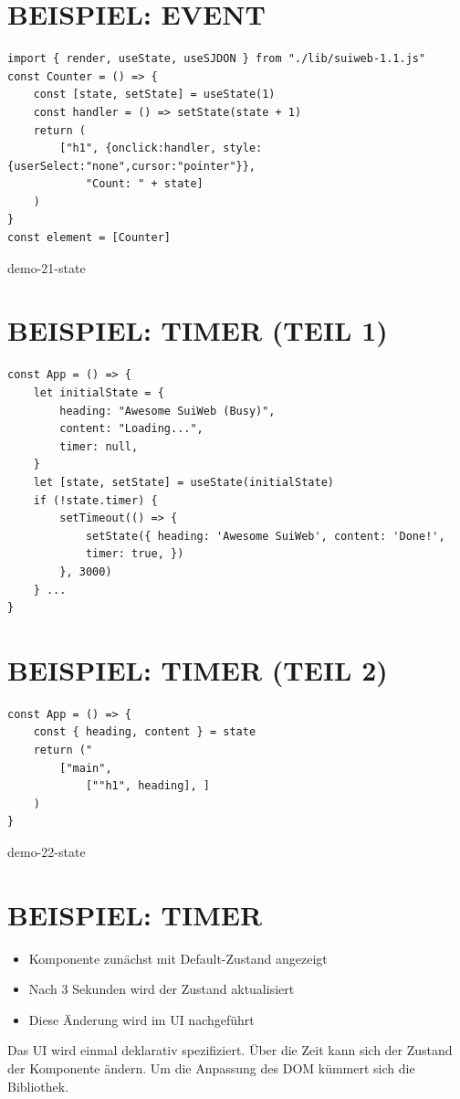 \section*{BEISPIEL: EVENT}
\begin{verbatim}
import { render, useState, useSJDON } from "./lib/suiweb-1.1.js"
const Counter = () => {
    const [state, setState] = useState(1)
    const handler = () => setState(state + 1)
    return (
        ["h1", {onclick:handler, style:{userSelect:"none",cursor:"pointer"}},
            "Count: " + state]
    )
}
const element = [Counter]
\end{verbatim}

demo-21-state

\section*{BEISPIEL: TIMER (TEIL 1)}
\begin{verbatim}
const App = () => {
    let initialState = {
        heading: "Awesome SuiWeb (Busy)",
        content: "Loading...",
        timer: null,
    }
    let [state, setState] = useState(initialState)
    if (!state.timer) {
        setTimeout(() => {
            setState({ heading: 'Awesome SuiWeb', content: 'Done!',
            timer: true, })
        }, 3000)
    } ...
}
\end{verbatim}

\section*{BEISPIEL: TIMER (TEIL 2)}
\begin{verbatim}
const App = () => {
    const { heading, content } = state
    return ("
        ["main",
            [""h1", heading], ]
    )
}
\end{verbatim}

demo-22-state

\section*{BEISPIEL: TIMER}
\begin{itemize}
  \item Komponente zunächst mit Default-Zustand angezeigt
  \item Nach 3 Sekunden wird der Zustand aktualisiert
  \item Diese Änderung wird im UI nachgeführt
\end{itemize}

Das UI wird einmal deklarativ spezifiziert. Über die Zeit kann sich der Zustand der Komponente ändern. Um die Anpassung des DOM kümmert sich die Bibliothek.

